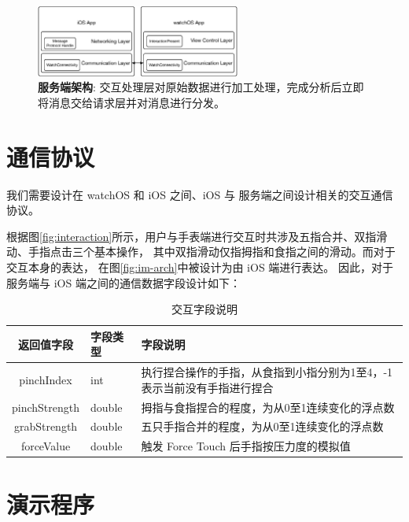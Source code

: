 \begin{figure}[H]
    \kaishu
    \centering
    \includegraphics[width=0.6\textwidth]{figures/client-arch}
    \caption{\kaishu \textbf{服务端架构}: 交互处理层对原始数据进行加工处理，完成分析后立即将消息交给请求层并对消息进行分发。}
    \label{fig:server-arch}
\end{figure}

\section{通信协议}

我们需要设计在 watchOS 和 iOS 之间、iOS 与 服务端之间设计相关的交互通信协议。

根据图\ref{fig:interaction}所示，用户与手表端进行交互时共涉及五指合并、双指滑动、手指点击三个基本操作，
其中双指滑动仅指拇指和食指之间的滑动。而对于交互本身的表达，
在图\ref{fig:im-arch}中被设计为由 iOS 端进行表达。
因此，对于服务端与 iOS 端之间的通信数据字段设计如下：

\begin{table}[H]
    \small
    \kaishu
    \centering
    \begin{tabular}{c l l}
        \toprule
        \textbf{返回值字段}        & \textbf{字段类型} & \textbf{字段说明} \\
        \hline
        pinchIndex     & int    & 执行捏合操作的手指，从食指到小指分别为1至4，-1表示当前没有手指进行捏合 \\
        pinchStrength  & double & 拇指与食指捏合的程度，为从0至1连续变化的浮点数 \\
        grabStrength   & double & 五只手指合并的程度，为从0至1连续变化的浮点数 \\
        forceValue     & double & 触发 Force Touch 后手指按压力度的模拟值\\
        \bottomrule
    \end{tabular}
    \caption{交互字段说明}
    \label{table:server-feild}
\end{table}

\section{演示程序}

